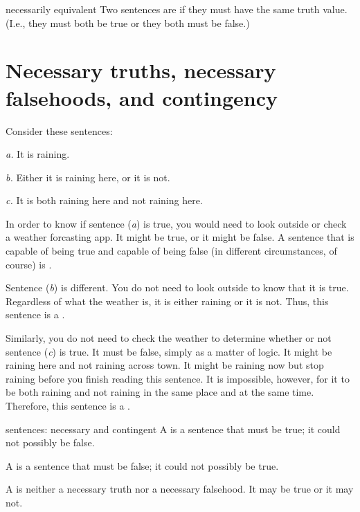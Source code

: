 \begin{factboxy}{necessarily equivalent}
Two sentences are  if they must have the same truth value. (I.e., they must both be true or they both must be false.)
\end{factboxy}


\section[Necessary truths, falsehoods, and contingency]{Necessary truths, necessary falsehoods, and contingency}\label{s:nec-truth}

Consider these sentences:
	\begin{earg}
		\item[\textit{a.}] It is raining.
		\item[\textit{b.}] Either it is raining here, or it is not.
		\item[\textit{c.}] It is both raining here and not raining here.
	\end{earg}
In order to know if sentence (\textit{a}) is true, you would need to look outside or check a weather forcasting app. It might be true, or it might be false. A sentence that is capable of being true and capable of being false (in different circumstances, of course) is .

Sentence (\textit{b}) is different. You do not need to look outside to know that it is true. Regardless of what the weather is, it is either raining or it is not. Thus, this sentence is a . 

Similarly, you do not need to check the weather to determine whether or not sentence (\textit{c}) is true. It must be false, simply as a matter of logic. It might be raining here and not raining across town. It might be raining now but stop raining before you finish reading this sentence. It is impossible, however, for it to be both raining and not raining in the same place and at the same time. Therefore, this sentence is a .

\begin{factboxy}{sentences: necessary and contingent}
\noindent A  is a sentence that must be true; it could not possibly be false.

\noindent A  is a sentence that must be false; it could not possibly be true.

\noindent A  is neither a necessary truth nor a necessary falsehood. It may be true or it may not.
\end{factboxy}

